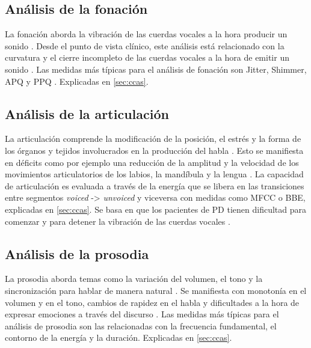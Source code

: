 \subsection{Análisis de la fonación}
La fonación aborda la vibración de las cuerdas vocales a la hora producir un sonido \cite{speechAnalysis}. Desde el punto de vista clínico, este análisis está relacionado con la curvatura y el cierre incompleto de las cuerdas vocales a la hora de emitir un sonido \cite{phonationfeat}. Las medidas más típicas para el análisis de fonación son Jitter, Shimmer, APQ y PPQ \cite{neurospeech}. Explicadas en \ref{sec:ccas}.

\subsection{Análisis de la articulación}
La articulación comprende la modificación de la posición, el estrés y la forma de los órganos y tejidos involucrados en la producción del habla \cite{speechAnalysis}. Esto se manifiesta en déficits como por ejemplo una reducción de la amplitud y la velocidad de los movimientos articulatorios de los labios, la mandíbula y la lengua \cite{articulationfeat}. La capacidad de articulación es evaluada a través de la energía que se libera en las transiciones entre segmentos \textit{voiced} -> \textit{unvoiced} y viceversa con medidas como MFCC o BBE, explicadas en \ref{sec:ccas}. Se basa en que los pacientes de PD tienen dificultad para comenzar y para detener la vibración de las cuerdas vocales \cite{neurospeech}.

\subsection{Análisis de la prosodia}
La prosodia aborda temas como la variación del volumen, el tono y la sincronización para hablar de manera natural \cite{speechAnalysis}. Se manifiesta con monotonía en el volumen y en el tono, cambios de rapidez en el habla y dificultades a la hora de expresar emociones a través del discurso \cite{emotionfeat}. Las medidas más típicas para el análisis de prosodia son las relacionadas con la frecuencia fundamental, el contorno de la energía y la duración. Explicadas en \ref{sec:ccas}.

